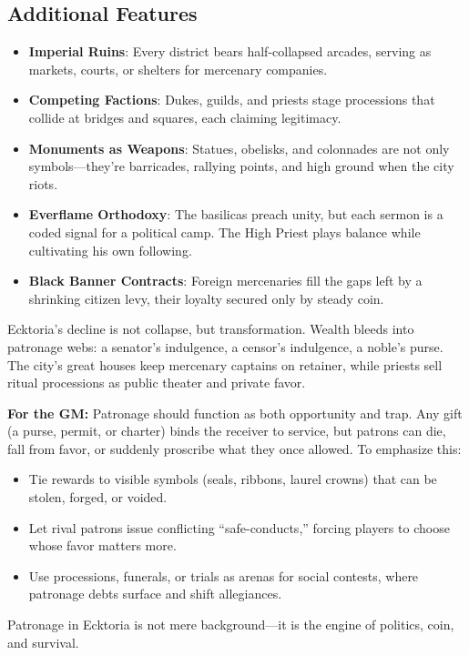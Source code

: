 \subsection*{Additional Features}
\begin{itemize}
\item \textbf{Imperial Ruins}: Every district bears half-collapsed arcades, serving as markets, courts, or shelters for mercenary companies.
\item \textbf{Competing Factions}: Dukes, guilds, and priests stage processions that collide at bridges and squares, each claiming legitimacy.
\item \textbf{Monuments as Weapons}: Statues, obelisks, and colonnades are not only symbols—they’re barricades, rallying points, and high ground when the city riots.
\item \textbf{Everflame Orthodoxy}: The basilicas preach unity, but each sermon is a coded signal for a political camp. The High Priest plays balance while cultivating his own following.
\item \textbf{Black Banner Contracts}: Foreign mercenaries fill the gaps left by a shrinking citizen levy, their loyalty secured only by steady coin.
\end{itemize}

\begin{tcolorbox}[colback=gray!7!white,colframe=black!60!white,title=Decline \& Patronage]
Ecktoria’s decline is not collapse, but transformation. Wealth bleeds into patronage webs: a senator’s indulgence, a censor’s indulgence, a noble’s purse. The city’s great houses keep mercenary captains on retainer, while priests sell ritual processions as public theater and private favor. 

\textbf{For the GM:}  
Patronage should function as both opportunity and trap. Any gift (a purse, permit, or charter) binds the receiver to service, but patrons can die, fall from favor, or suddenly proscribe what they once allowed. To emphasize this:
\begin{itemize}
\item Tie rewards to visible symbols (seals, ribbons, laurel crowns) that can be stolen, forged, or voided.
\item Let rival patrons issue conflicting “safe-conducts,” forcing players to choose whose favor matters more.
\item Use processions, funerals, or trials as arenas for social contests, where patronage debts surface and shift allegiances.
\end{itemize}
Patronage in Ecktoria is not mere background—it is the engine of politics, coin, and survival.
\end{tcolorbox}


